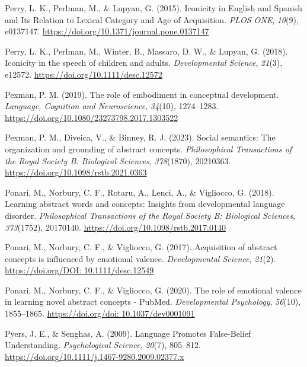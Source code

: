 \documentclass[
  man,floatsintext]{apa6}
\newlength{\cslhangindent}
\newenvironment{CSLReferences}[2] %
 {\begin{list}{}{%
  \setlength{\itemindent}{0pt}
  \setlength{\leftmargin}{0pt}
  \setlength{\parsep}{0pt}
  \ifodd #1
   \setlength{\leftmargin}{\cslhangindent}
   \setlength{\itemindent}{-1\cslhangindent}
  \fi
  \setlength{\itemsep}{#2\baselineskip}}}
 {\end{list}}
\begin{document}
\begin{CSLReferences}{1}{0}
Perry, L. K., Perlman, M., \& Lupyan, G. (2015). Iconicity in {English} and {Spanish} and {Its Relation} to {Lexical Category} and {Age} of {Acquisition}. \emph{PLOS ONE}, \emph{10}(9), e0137147. \url{https://doi.org/10.1371/journal.pone.0137147}

Perry, L. K., Perlman, M., Winter, B., Massaro, D. W., \& Lupyan, G. (2018). Iconicity in the speech of children and adults. \emph{Developmental Science}, \emph{21}(3), e12572. \url{https://doi.org/10.1111/desc.12572}

Pexman, P. M. (2019). The role of embodiment in conceptual development. \emph{Language, Cognition and Neuroscience}, \emph{34}(10), 1274--1283. \url{https://doi.org/10.1080/23273798.2017.1303522}

Pexman, P. M., Diveica, V., \& Binney, R. J. (2023). Social semantics: The organization and grounding of abstract concepts. \emph{Philosophical Transactions of the Royal Society B: Biological Sciences}, \emph{378}(1870), 20210363. \url{https://doi.org/10.1098/rstb.2021.0363}

Ponari, M., Norbury, C. F., Rotaru, A., Lenci, A., \& Vigliocco, G. (2018). Learning abstract words and concepts: Insights from developmental language disorder. \emph{Philosophical Transactions of the Royal Society B: Biological Sciences}, \emph{373}(1752), 20170140. \url{https://doi.org/10.1098/rstb.2017.0140}

Ponari, M., Norbury, C. F., \& Vigliocco, G. (2017). Acquisition of abstract concepts is influenced by emotional valence. \emph{Developmental Science}, \emph{21}(2). \href{https://doi.org/DOI:\%2010.1111/desc.12549}{https://doi.org/DOI: 10.1111/desc.12549}

Ponari, M., Norbury, C. F., \& Vigliocco, G. (2020). The role of emotional valence in learning novel abstract concepts - {PubMed}. \emph{Developmental Psychology}, \emph{56}(10), 1855--1865. \href{https://doi.org/doi:\%2010.1037/dev0001091}{https://doi.org/doi: 10.1037/dev0001091}

Pyers, J. E., \& Senghas, A. (2009). Language {Promotes False-Belief Understanding}. \emph{Psychological Science}, \emph{20}(7), 805--812. \url{https://doi.org/10.1111/j.1467-9280.2009.02377.x}


\end{CSLReferences}
\end{document}

